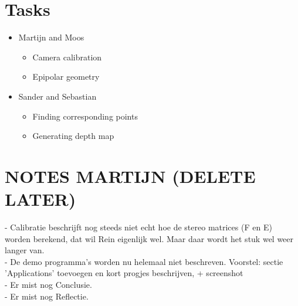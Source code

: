 \documentclass[a4paper]{article}
\begin{document}
\section{Tasks}
  \begin{itemize}
    \item Martijn and Moos
    \begin{itemize}
      \item Camera calibration
      \item Epipolar geometry
    \end{itemize}
    \item Sander and Sebastian
    \begin{itemize}
      \item Finding corresponding points
      \item Generating depth map
    \end{itemize}
  \end{itemize}

\section{NOTES MARTIJN (DELETE LATER)}

 - Calibratie beschrijft nog steeds niet echt hoe de stereo matrices (F en E)
   worden berekend, dat wil Rein eigenlijk wel. Maar daar wordt het stuk wel
   weer langer van. \\
 - De demo programma's worden nu helemaal niet beschreven. Voorstel: sectie
   'Applications' toevoegen en kort progjes beschrijven, + screenshot \\
 - Er mist nog Conclusie. \\
 - Er mist nog Reflectie. \\


 
\end{document}
